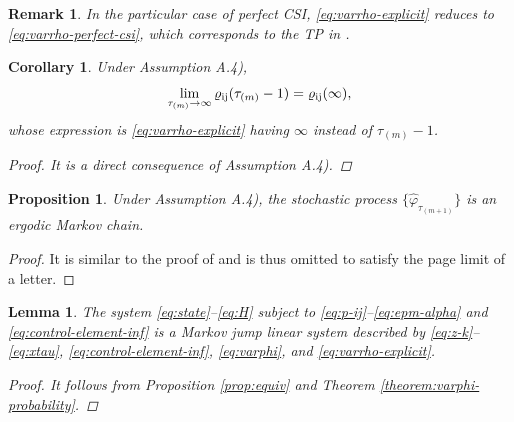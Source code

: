 \documentclass[journal,twoside,web]{ieeecolor}
\newtheorem{corollary}{Corollary}[theorem]
\newtheorem{remark}{Remark}
\newtheorem{lemma}{Lemma}
\newtheorem{proposition}{Proposition}
\begin{document}
\begin{remark}\label{rem:automatica-2}
    In the particular case of perfect CSI, \eqref{eq:varrho-explicit} reduces to \eqref{eq:varrho-perfect-csi}, which corresponds to the TP in \cite[Eq. (30)]{yZL-2025-automatica}.
\end{remark}

\begin{corollary}\label{corollary:varrho-inf}
    Under Assumption A.4), 
\begin{equation}
    \text{\small $\lim_{\tau_{(m)}\to \infty} \varrho_{\mathrm{i}\mathrm{j}}(\tau_{(m)}-1) = \varrho_{\mathrm{i}\mathrm{j}}(\infty),$}
\end{equation}
whose expression is \eqref{eq:varrho-explicit} having $\infty$ instead of $\tau_{(m)}-1$.

\begin{proof}
    It is a direct consequence of Assumption A.4).
\end{proof}
\end{corollary}

\begin{proposition}\label{prop:ergodicity}
	Under Assumption A.4), the stochastic process $\{\hat{\varphi}_{\tau_{(m+1)}}\}$ is an ergodic Markov chain.
\end{proposition}
\begin{proof}
    It is similar to the proof of \cite[Prop. 15]{yZL-2025-automatica} and is thus omitted to satisfy the page limit of a letter. 
\end{proof}
\begin{lemma}\label{lemma:mjls-stability}
    The system \eqref{eq:state}–\eqref{eq:H} subject to \eqref{eq:p-ij}–\eqref{eq:epm-alpha} and \eqref{eq:control-element-inf} is a Markov jump linear system %
    described by \eqref{eq:z-k}–\eqref{eq:xtau}, \eqref{eq:control-element-inf}, \eqref{eq:varphi}, and \eqref{eq:varrho-explicit}.

\begin{proof}
    It follows from Proposition \ref{prop:equiv} %
    and Theorem \ref{theorem:varphi-probability}.
\end{proof}
\end{lemma}
\end{document}
